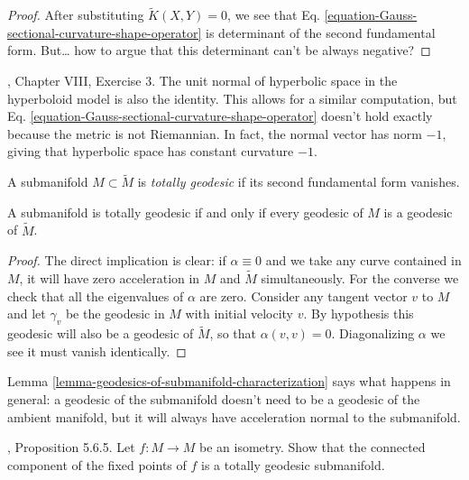 \begin{proof}
After substituting $\tilde{K}(X,Y)=0$, we see that Eq. 
\ref{equation-Gauss-sectional-curvature-shape-operator} is determinant of the second fundamental form. 
 But… how to argue that this determinant can't be always negative?
\end{proof}

\begin{example}
\label{example-hyperbolic-space}
\cite{doc}, Chapter VIII, Exercise 3. The unit normal of hyperbolic space in the
hyperboloid model is also the identity. This allows for a similar computation,
but Eq. \ref{equation-Gauss-sectional-curvature-shape-operator} doesn't hold 
exactly because the
metric is not Riemannian. In fact, the normal vector has norm $-1$, giving that
hyperbolic space has constant curvature $-1$.
\end{example}

\begin{definition}
\label{definition-totally-geodesic-submanifold}
A submanifold $M\subset\tilde{M}$ is {\it totally geodesic} if its second
fundamental form vanishes.
\end{definition}

\begin{lemma}
\label{lemma-totally-geodesic-submanifold}
A submanifold is totally geodesic if and only if every geodesic of $M$ is a
geodesic of $\tilde{M}$.
\end{lemma}

\begin{proof}
The direct implication is clear: if $\alpha \equiv 0$ and we take any curve
contained in $M$, it will have zero acceleration in $M$ and $\tilde{M}$
simultaneously. For the converse we check that all the eigenvalues
of $\alpha$ are zero. Consider any tangent vector $v$ to $M$ and let $\gamma_v$
be the geodesic in $M$ with initial velocity $v$. By hypothesis this geodesic
will also be a geodesic of $\tilde{M}$, so that $\alpha(v,v)=0$. Diagonalizing
$\alpha$ we see it must vanish identically.
\end{proof}

Lemma \ref{lemma-geodesics-of-submanifold-characterization} says what happens in
general: a geodesic of the submanifold doesn't need to be a geodesic of the
ambient manifold, but it will always have acceleration normal to the
submanifold.

\begin{exercise}
\label{exercise-fixed-point-set-of-isometry-is-totally-geodesic-submanifold}
\cite{pet}, Proposition 5.6.5. Let $f:M\to M$ be an isometry. Show that the
connected component of the fixed points of $f$ is a totally geodesic
submanifold.
\end{exercise}

